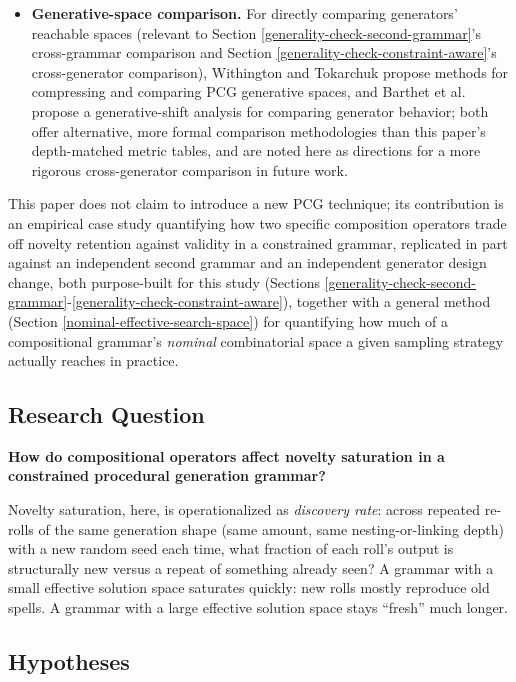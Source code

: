 \documentclass[]{article}
\begin{document}
\begin{itemize}
            \item
                \textbf{Generative-space comparison.} For directly comparing generators' reachable spaces (relevant to Section \ref{generality-check-second-grammar}'s cross-grammar comparison and Section \ref{generality-check-constraint-aware}'s cross-generator comparison), Withington and Tokarchuk propose methods for compressing and comparing PCG generative spaces, and Barthet et al. propose a generative-shift analysis for comparing generator behavior; both offer alternative, more formal comparison methodologies than this paper's depth-matched metric tables, and are noted here as directions for a more rigorous cross-generator comparison in future work.
        \end{itemize}
        
        This paper does not claim to introduce a new PCG technique; its contribution is an empirical case study quantifying how two specific composition operators trade off novelty retention against validity in a constrained grammar, replicated in part against an independent second grammar and an independent generator design change, both purpose-built for this study (Sections \ref{generality-check-second-grammar}-\ref{generality-check-constraint-aware}), together with a general method (Section \ref{nominal-effective-search-space}) for quantifying how much of a compositional grammar's \textit{nominal} combinatorial space a given sampling strategy actually reaches in practice.

        \subsection{Research Question}\label{research-question}

        \textbf{How do compositional operators affect novelty saturation in a constrained procedural generation grammar?}
        
        Novelty saturation, here, is operationalized as \textit{discovery rate}: across repeated re-rolls of the same generation shape (same amount, same nesting-or-linking depth) with a new random seed each time, what fraction of each roll's output is structurally new versus a repeat of something already seen? A grammar with a small effective solution space saturates quickly: new rolls mostly reproduce old spells. A grammar with a large effective solution space stays ``fresh'' much longer.

        \subsection{Hypotheses}\label{hypotheses}
\end{document}

